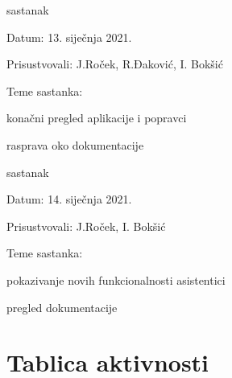 \begin{packed_enum}
		\item  sastanak
		\item[] \begin{packed_item}
			\item Datum: 13. siječnja 2021.
			\item Prisustvovali: J.Roček, R.Đaković, I. Bokšić
			\item Teme sastanka:
			\begin{packed_item}
				\item konačni pregled aplikacije i popravci
				\item rasprava oko dokumentacije
			\end{packed_item}
		\end{packed_item}
		
		\item  sastanak
		\item[] \begin{packed_item}
			\item Datum: 14. siječnja 2021.
			\item Prisustvovali: J.Roček, I. Bokšić
			\item Teme sastanka:
			\begin{packed_item}
				\item pokazivanje novih funkcionalnosti asistentici
				\item pregled dokumentacije
			\end{packed_item}
		\end{packed_item}
		
	\end{packed_enum}

		
		
		\eject
		\section*{Tablica aktivnosti}
		
			
					
						
			
